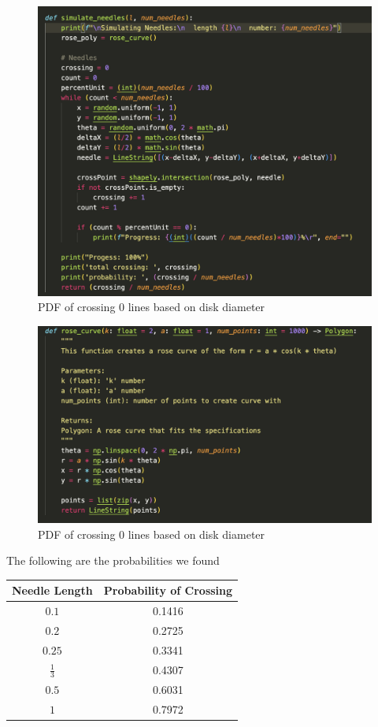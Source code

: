 \documentclass{article}
\begin{document}
\begin{figure}[hbt!]
    \centering
    \includegraphics[width=0.95\linewidth]{images/alg.png}
    \caption{PDF of crossing 0 lines based on disk diameter}
    \label{fig:alg}
\end{figure}
\begin{figure}[hbt!]
    \centering
    \includegraphics[width=0.95\linewidth]{images/rose.png}
    \caption{PDF of crossing 0 lines based on disk diameter}
    \label{fig:rose}
\end{figure}


The following are the probabilities we found
\begin{table}
    \centering
    \begin{tabular}{|c|c|}
        \hline
        Needle Length & Probability of Crossing \\
        \hline \hline
        $0.1$ & 0.1416 \\
        \hline
        $0.2$ & 0.2725 \\
        \hline
        $0.25$ & 0.3341 \\
        \hline
        $\frac{1}{3}$ & 0.4307 \\
        \hline
        $0.5$ & 0.6031 \\
        \hline
        $1$ & 0.7972 \\
        \hline


    \end{tabular}
\end{table}
\end{document}
